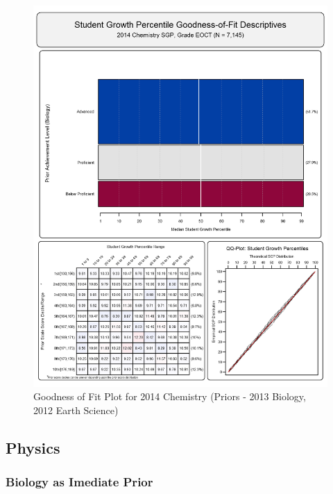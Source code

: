 \documentclass[12pt]{article}
\begin{document}
\begin{figure}[htbp]
\centering
\includegraphics{../img/Goodness_of_Fit/CHEMISTRY.2014/2014_CHEMISTRY_EOCT;2013_BIOLOGY_EOCT;2012_EARTH_SCIENCE_EOCT.png}
\caption{Goodness of Fit Plot for 2014 Chemistry (Priors - 2013 Biology,
2012 Earth Science)}
\end{figure}

\clearpage 

\subsection{Physics}\label{physics}

\subsubsection{Biology as Imediate
Prior}\label{biology-as-imediate-prior}
\end{document}
